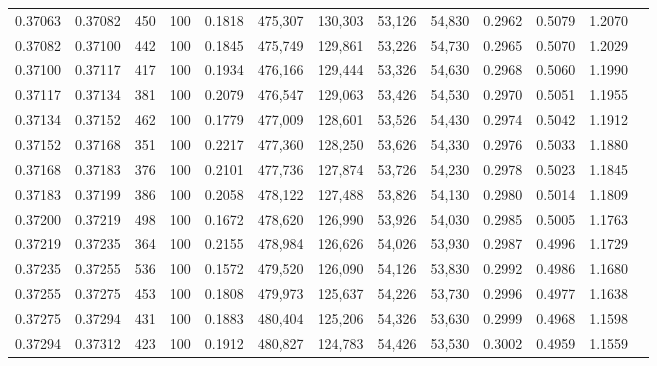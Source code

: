 \begin{tabular}{rrrrrrrrrrrrr}
0.37063 & 0.37082 &   450 & 100 &                                     0.1818 & 475,307 & 130,303 &  53,126 &  54,830 & 0.2962 & 0.5079 & 1.2070 \\
0.37082 & 0.37100 &   442 & 100 &                                     0.1845 & 475,749 & 129,861 &  53,226 &  54,730 & 0.2965 & 0.5070 & 1.2029 \\
0.37100 & 0.37117 &   417 & 100 &                                     0.1934 & 476,166 & 129,444 &  53,326 &  54,630 & 0.2968 & 0.5060 & 1.1990 \\
0.37117 & 0.37134 &   381 & 100 &                                     0.2079 & 476,547 & 129,063 &  53,426 &  54,530 & 0.2970 & 0.5051 & 1.1955 \\
0.37134 & 0.37152 &   462 & 100 &                                     0.1779 & 477,009 & 128,601 &  53,526 &  54,430 & 0.2974 & 0.5042 & 1.1912 \\
0.37152 & 0.37168 &   351 & 100 &                                     0.2217 & 477,360 & 128,250 &  53,626 &  54,330 & 0.2976 & 0.5033 & 1.1880 \\
0.37168 & 0.37183 &   376 & 100 &                                     0.2101 & 477,736 & 127,874 &  53,726 &  54,230 & 0.2978 & 0.5023 & 1.1845 \\
0.37183 & 0.37199 &   386 & 100 &                                     0.2058 & 478,122 & 127,488 &  53,826 &  54,130 & 0.2980 & 0.5014 & 1.1809 \\
0.37200 & 0.37219 &   498 & 100 &                                     0.1672 & 478,620 & 126,990 &  53,926 &  54,030 & 0.2985 & 0.5005 & 1.1763 \\
0.37219 & 0.37235 &   364 & 100 &                                     0.2155 & 478,984 & 126,626 &  54,026 &  53,930 & 0.2987 & 0.4996 & 1.1729 \\
0.37235 & 0.37255 &   536 & 100 &                                     0.1572 & 479,520 & 126,090 &  54,126 &  53,830 & 0.2992 & 0.4986 & 1.1680 \\
0.37255 & 0.37275 &   453 & 100 &                                     0.1808 & 479,973 & 125,637 &  54,226 &  53,730 & 0.2996 & 0.4977 & 1.1638 \\
0.37275 & 0.37294 &   431 & 100 &                                     0.1883 & 480,404 & 125,206 &  54,326 &  53,630 & 0.2999 & 0.4968 & 1.1598 \\
0.37294 & 0.37312 &   423 & 100 &                                     0.1912 & 480,827 & 124,783 &  54,426 &  53,530 & 0.3002 & 0.4959 & 1.1559 \\

\end{tabular}
